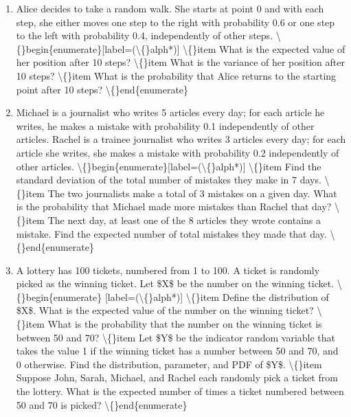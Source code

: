 \documentclass[11pt]{article}
\begin{document}
\begin{enumerate}[label=\textbf{Q\arabic*.}]
    \item [\textbackslash\{\}textbf\{Random Walk\}, 10 points] Alice decides to take a random walk. She starts at point 0 and with each step, she either moves one step to the right with probability 0.6 or one step to the left with probability 0.4, independently of other steps.
 \textbackslash\{\}begin\{enumerate\}[label=(\textbackslash\{\}alph*)]
 \textbackslash\{\}item What is the expected value of her position after 10 steps?
 \textbackslash\{\}item What is the variance of her position after 10 steps?
 \textbackslash\{\}item What is the probability that Alice returns to the starting point after 10 steps?
 \textbackslash\{\}end\{enumerate\}

    \item [\textbackslash\{\}textbf\{News Errors\}, 10 points] Michael is a journalist who writes 5 articles every day; for each article he writes, he makes a mistake with probability 0.1 independently of other articles. Rachel is a trainee journalist who writes 3 articles every day; for each article she writes, she makes a mistake with probability 0.2 independently of other articles.
\textbackslash\{\}begin\{enumerate\}[label=(\textbackslash\{\}alph*)]
 \textbackslash\{\}item Find the standard deviation of the total number of mistakes they make in 7 days.
 \textbackslash\{\}item The two journalists make a total of 3 mistakes on a given day. What is the probability that Michael made more mistakes than Rachel that day?
 \textbackslash\{\}item The next day, at least one of the 8 articles they wrote contains a mistake. Find the expected number of total mistakes they made that day.
\textbackslash\{\}end\{enumerate\}

    \item [\textbackslash\{\}textbf\{Lottery Tickets\}, 10 points] A lottery has 100 tickets, numbered from 1 to 100. A ticket is randomly picked as the winning ticket. Let \$X\$ be the number on the winning ticket.
 \textbackslash\{\}begin\{enumerate\} [label=(\textbackslash\{\}alph*)]
 \textbackslash\{\}item Define the distribution of \$X\$. What is the expected value of the number on the winning ticket?
 \textbackslash\{\}item What is the probability that the number on the winning ticket is between 50 and 70?
 \textbackslash\{\}item Let \$Y\$ be the indicator random variable that takes the value 1 if the winning ticket has a number between 50 and 70, and 0 otherwise. Find the distribution, parameter, and PDF of \$Y\$.
 \textbackslash\{\}item Suppose John, Sarah, Michael, and Rachel each randomly pick a ticket from the lottery. What is the expected number of times a ticket numbered between 50 and 70 is picked?
 \textbackslash\{\}end\{enumerate\}

\end{enumerate}
\end{document}
